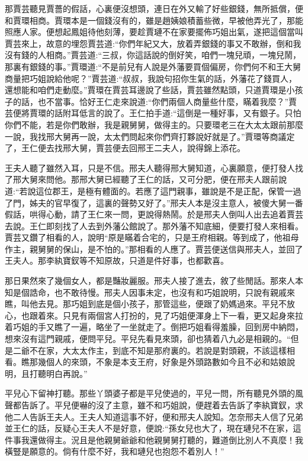 \begin{parag}
    那賈芸聽見賈薔的假話，心裏便沒想頭，連日在外又輸了好些銀錢，無所抵償，便和賈環相商。賈環本是一個錢沒有的，雖是趙姨娘積蓄些微，早被他弄光了，那能照應人家。便想起鳳姐待他刻薄，要趁賈璉不在家要擺佈巧姐出氣，遂把這個當叫賈芸來上，故意的埋怨賈芸道:“你們年紀又大，放着弄銀錢的事又不敢辦，倒和我沒有錢的人相商。”賈芸道:“三叔，你這話說的倒好笑，咱們一塊兒頑，一塊兒鬧，那裏有銀錢的事。”賈環道:“不是前兒有人說是外藩要買個偏房，你們何不和王大舅商量把巧姐說給他呢？”賈芸道:“叔叔，我說句招你生氣的話，外藩花了錢買人，還想能和咱們走動麼。”賈環在賈芸耳邊說了些話，賈芸雖然點頭，只道賈環是小孩子的話，也不當事。恰好王仁走來說道:“你們兩個人商量些什麼，瞞着我麼？”賈芸便將賈環的話附耳低言的說了。王仁拍手道:“這倒是一種好事，又有銀子。只怕你們不能，若是你們敢辦，我是親舅舅，做得主的。只要環老三在大太太跟前那麼一說，我找邢大舅再一說，太太們問起來你們齊打夥說好就是了。”賈環等商議定了，王仁便去找邢大舅，賈芸便去回邢王二夫人，說得錦上添花。
\end{parag}


\begin{parag}
    王夫人聽了雖然入耳，只是不信。邢夫人聽得邢大舅知道，心裏願意，便打發人找了邢大舅來問他。那邢大舅已經聽了王仁的話，又可分肥，便在邢夫人跟前說道:“若說這位郡王，是極有體面的。若應了這門親事，雖說是不是正配，保管一過了門，姊夫的官早復了，這裏的聲勢又好了。”邢夫人本是沒主意人，被傻大舅一番假話，哄得心動，請了王仁來一問，更說得熱鬧。於是邢夫人倒叫人出去追着賈芸去說。王仁即刻找了人去到外藩公館說了。那外藩不知底細，便要打發人來相看。賈芸又鑽了相看的人，說明“原是瞞着合宅的，只是王府相親。等到成了，他祖母作主，親舅舅的保山，是不怕的。”那相看的人應了。賈芸便送信與邢夫人，並回了王夫人。那李紈寶釵等不知原故，只道是件好事，也都歡喜。
\end{parag}


\begin{parag}
    那日果然來了幾個女人，都是豔妝麗服。邢夫人接了進去，敘了些閒話。那來人本知是個誥命，也不敢待慢。邢夫人因事未定，也沒有和巧姐說明，只說有親戚來瞧，叫他去見。那巧姐到底是個小孩子，那管這些，便跟了奶媽過來。平兒不放心，也跟着來。只見有兩個宮人打扮的，見了巧姐便渾身上下一看，更又起身來拉着巧姐的手又瞧了一遍，略坐了一坐就走了。倒把巧姐看得羞臊，回到房中納悶，想來沒有這門親戚，便問平兒。平兒先看見來頭，卻也猜着八九必是相親的。“但是二爺不在家，大太太作主，到底不知是那府裏的。若說是對頭親，不該這樣相看。瞧那幾個人的來頭，不象是本支王府，好象是外頭路數如今且不必和姑娘說明，且打聽明白再說。”
\end{parag}


\begin{parag}
    平兒心下留神打聽。那些丫頭婆子都是平兒使過的，平兒一問，所有聽見外頭的風聲都告訴了。平兒便嚇的沒了主意，雖不和巧姐說，便趕着去告訴了李紈寶釵，求他二人告訴王夫人。王夫人知道這事不好，便和邢夫人說知。怎奈邢夫人信了兄弟並王仁的話，反疑心王夫人不是好意，便說:“孫女兒也大了，現在璉兒不在家，這件事我還做得主。況且是他親舅爺爺和他親舅舅打聽的，難道倒比別人不真麼！我橫豎是願意的。倘有什麼不好，我和璉兒也抱怨不着別人！”
\end{parag}


